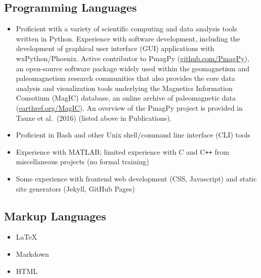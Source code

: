 \documentclass[10pt,a4paper,sans]{moderncv}
\begin{document}
\subsection{Programming Languages}
\vspace{5pt}
\begin{itemize}[itemsep=0pt]
    \item {\begin{minipage}[t]{\linewidth}
                \raggedright
        \end{minipage}}
        \raggedright
        \subitem Proficient with a variety of scientific computing and
        data analysis tools written in Python. Experience with software development, including the
        development of graphical user interface (GUI) applications with
        wxPython/Phoenix. Active contributor to PmagPy
        ({\color{cyan}\href{https://github.com/PmagPy}{github.com/PmagPy}}), an
        open-source software package widely used within the geomagnetism and
        paleomagnetism research communities that also provides the core data
        analysis and visualization tools underlying the Magnetics Information
        Consotium (MagIC) database, an online archive of paleomagnetic data
        ({\color{cyan}\href{https://www2.earthref.org/MagIC}{earthref.org/MagIC}}).
        An overview of the PmagPy project is provided in Tauxe et al.\
        (2016) (listed above in Publications).
    \item Proficient in Bash and other Unix shell/command line interface
        (CLI) tools
    \item Experience with MATLAB; limited experience with C and
        C\texttt{++} from miscellaneous projects (no formal training)
    \item Some experience with frontend web development (CSS, Javascript) and
        static site generators (Jekyll, GitHub Pages)
\end{itemize}
\pagebreak[4]
\subsection{Markup Languages}
\vspace{-10pt}
\begin{multicols}{3}
\begin{itemize}%
    \item {\large{}\selectfont\LaTeX}\\
        \raggedright\normalsize
    \item Markdown
    \item HTML
\end{itemize}
\end{multicols}
\vspace{-15pt}
\end{document}
